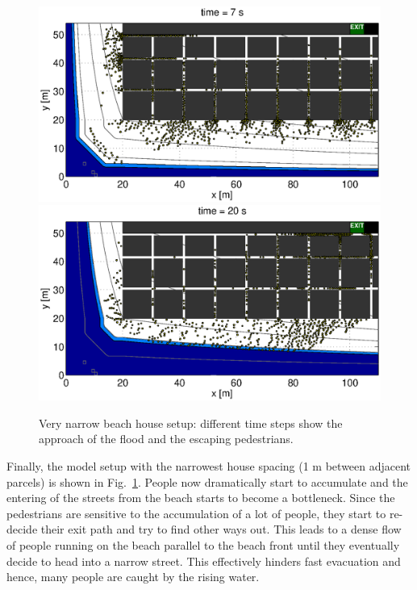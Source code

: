 \documentclass[11pt]{article}
\begin{document}
\begin{figure}
	\centering
	\includegraphics[width=1.1\textwidth]{figures/BeachEvacuationOneExitStreetWidth1_Flood0_1_000700.eps}
	\qquad
	\includegraphics[width=1.1\textwidth]{figures/BeachEvacuationOneExitStreetWidth1_Flood0_1_002000.eps}
	\caption{Very narrow beach house setup: different time steps show the approach of the flood and the escaping pedestrians.}
	\label{fig:beach_4}
\end{figure}

Finally, the model setup with the narrowest house spacing (1 m between adjacent parcels) is shown in Fig.~\ref{fig:beach_4}. People now dramatically start to accumulate and the entering of the streets from the beach starts to become a bottleneck. Since the pedestrians are sensitive to the accumulation of a lot of people, they start to re-decide their exit path and try to find other ways out. This leads to a dense flow of people running on the beach parallel to the beach front until they eventually decide to head into a narrow street. This effectively hinders fast evacuation and hence, many people are caught by the rising water.
\end{document}
